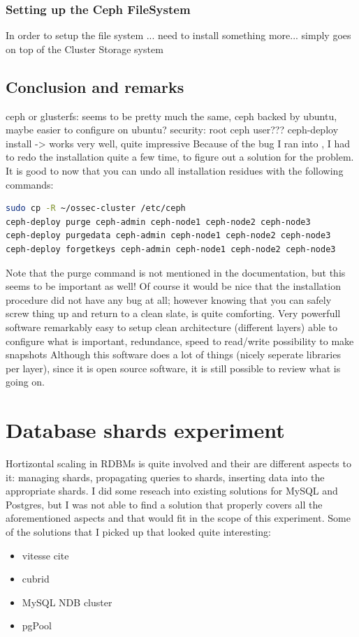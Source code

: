 \documentclass[12pt]{report}
\begin{document}
\subsubsection{Setting up the Ceph FileSystem}
In order to setup the file system ... need to install something
more...
simply goes on top of the Cluster Storage system

\subsection{Conclusion and remarks}
ceph or glusterfs: seems to be pretty much the same, ceph backed by
ubuntu, maybe easier to  configure on ubuntu?
security: root ceph user???
ceph-deploy install -> works very well, quite impressive
Because of the bug I ran into \cite{ceph_bug_1}, I had to redo the
installation quite a few time, to figure out a solution for the
problem.
It is good to now that you can undo all installation residues with the
following commands:
\begin{lstlisting}[language=bash]
sudo cp -R ~/ossec-cluster /etc/ceph
ceph-deploy purge ceph-admin ceph-node1 ceph-node2 ceph-node3
ceph-deploy purgedata ceph-admin ceph-node1 ceph-node2 ceph-node3
ceph-deploy forgetkeys ceph-admin ceph-node1 ceph-node2 ceph-node3
\end{lstlisting}
Note that the purge command is not mentioned in the documentation, but
this seems to be important as well!
Of course it would be nice that the installation procedure did not have any bug
at all; however knowing that you can safely screw thing up and return to a
clean slate, is quite comforting.
Very powerfull software
remarkably easy to setup
clean architecture (different layers)
able to configure what is important, redundance, speed to read/write 
possibility to make snapshots
Although this software does a lot of things (nicely seperate libraries
per layer), since it is open source software, it is still possible to
review what is going on.

\section{Database shards experiment}
Hortizontal scaling in RDBMs is quite involved and their are different
aspects to it: managing shards, propagating queries to shards,
inserting data into the appropriate shards.
I did some reseach into existing solutions for MySQL and Postgres, but
I was not able to find a solution that properly covers all the
aforementioned aspects and that would fit in the scope of this
experiment.
Some of the solutions that I picked up that looked quite interesting:
\begin{itemize}
\item vitesse cite
\item cubrid
\item MySQL NDB cluster
\item pgPool
\end{itemize}
\end{document}
